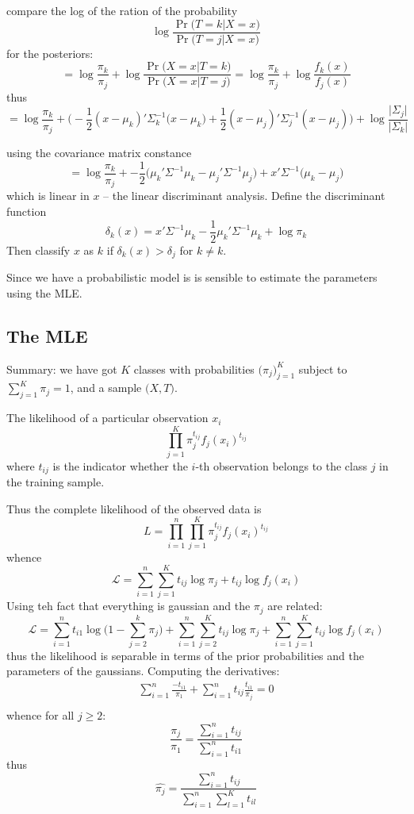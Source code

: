 \documentclass[a4paper]{article}
\begin{document}
compare the log of the ration of the probability
\[\log \frac{\Pr\big(T=k\vert X=x\big)}{\Pr\big(T=j\vert X=x\big)} \]
for the posteriors:
\[ = \log \frac{\pi_k}{\pi_j} + \log \frac{\Pr\big(X=x\vert T=k\big)}{\Pr\big(X=x\vert T=j\big)} = \log \frac{\pi_k}{\pi_j} + \log \frac{f_k(x)}{f_j(x)} \]
thus
\[ = \log \frac{\pi_k}{\pi_j} + \Big( -\frac{1}{2}(x-\mu_k)'\Sigma_k^{-1}(x-\mu_k\Big) + \frac{1}{2}(x-\mu_j)'\Sigma_j^{-1}(x-\mu_j) \Big) + \log\frac{\lvert \Sigma_j\rvert}{\lvert \Sigma_k\rvert} \]

using the covariance matrix constance
\[ = \log \frac{\pi_k}{\pi_j} + -\frac{1}{2}\big(\mu_k'\Sigma^{-1}\mu_k - \mu_j'\Sigma^{-1}\mu_j \big) + x'\Sigma^{-1}\big( \mu_k - \mu_j\big) \]
which is linear in $x$ -- the linear discriminant analysis. Define the discriminant function
\[\delta_k(x) = x'\Sigma^{-1}\mu_k - \frac{1}{2} \mu_k'\Sigma^{-1}\mu_k + \log \pi_k\]
Then  classify $x$ as $k$ if $\delta_k(x)>\delta_j$ for $k\neq k$.

Since we have a probabilistic model is is sensible to estimate the parameters using the MLE.

\subsection{The MLE} %
\label{sub:the_mle}

Summary:
we have got $K$ classes with probabilities $\big(\pi_j\big)_{j=1}^K$ subject to $\sum_{j=1}^K \pi_j = 1$, and a sample $\big(X,T\big)$.


The likelihood of a particular observation $x_i$
\[\prod_{j=1}^K \pi_j^{t_{ij}} f_j(x_i)^{t_{ij}}\]
where $t_{ij}$ is the indicator whether the $i$-th observation belongs to the class $j$ in the training sample.

Thus the complete likelihood of the observed data is
\[L = \prod_{i=1}^n \prod_{j=1}^K \pi_j^{t_{ij}} f_j(x_i)^{t_{ij}}\]
whence
\[\mathcal{L} = \sum_{i=1}^n \sum_{j=1}^K t_{ij} \log \pi_j + t_{ij} \log f_j(x_i)\]
Using teh fact that everything is gaussian and the $\pi_j$ are related:
\[\mathcal{L} = \sum_{i=1}^n t_{i1} \log \big( 1- \sum_{j=2}^k\pi_j \big) +  \sum_{i=1}^n \sum_{j=2}^K t_{ij} \log \pi_j +  \sum_{i=1}^n \sum_{j=1}^K t_{ij} \log f_j(x_i)\]
thus the likelihood is separable in terms of the prior probabilities and the parameters of the gaussians.
Computing the derivatives:
\begin{align*}
	\sum_{i=1}^n \frac{-t_{i1}}{\pi_1} +  \sum_{i=1}^n t_{ij} \frac{t_{i1}}{\pi_j} = 0\\
\end{align*}
whence for all $j\geq 2$:
\[\frac{\pi_j}{\pi_1} = \frac{\sum_{i=1}^n t_{ij}}{\sum_{i=1}^n t_{i1}}\]
thus
\[\hat{\pi_j} = \frac{\sum_{i=1}^n t_{ij}}{\sum_{i=1}^n \sum_{l=1}^K t_{il}}\]
\end{document}
